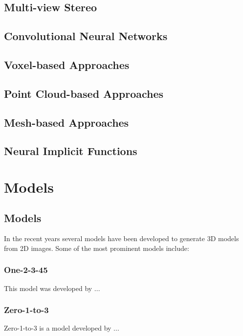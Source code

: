\subsection{Multi-view Stereo}
\textcite{furukawa_accurate_2010}

\subsection{Convolutional Neural Networks}
\textcite{krizhevsky_imagenet_2012}

\subsection{Voxel-based Approaches}
\textcite{zhirong_wu_3d_2015}

\subsection{Point Cloud-based Approaches}
\textcite{charles_pointnet_2017}
\subsection{Mesh-based Approaches}
\textcite{wang_pixel2mesh_2018}
\subsection{Neural Implicit Functions}

\textcite{park_deepsdf_2019}
\textcite{mildenhall_nerf_2021}

\section{Models}


\subsection{Models}
In the recent years several models have been developed to generate 3D models from 2D images. Some of the most prominent models include:
\subsubsection{One-2-3-45}
This model was developed by \textcite{liu_one-2-3-45_2023-1}...

\subsubsection{Zero-1-to-3}
Zero-1-to-3 is a model developed by \textcite{liu_zero-1--3_2023}...
